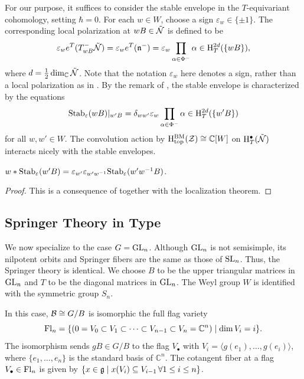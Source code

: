 For our purpose, it suffices to consider the stable envelope in the $T$-equivariant cohomology, setting $\hbar = 0$. For each $w \in W$, choose a sign $\varepsilon_w \in \{\pm 1\}$. The corresponding local polarization at $wB \in \tilde{\mathcal{N}}$ is defined to be
\begin{equation*}
    \varepsilon_w e^T(T^-_{wB}\tilde{\mathcal{N}})
    =
    \varepsilon_w e^T(\mathfrak{n}^-)
    =
    \varepsilon_w \prod_{\alpha \in \Phi^-}\alpha
    \in
    \mathrm{H}_T^{2d}(\{wB\}),
\end{equation*}
where $d = \frac{1}{2}\dim_\mathbb{C}\tilde{\mathcal{N}}$. Note that the notation $\varepsilon_w$ here denotes a sign, rather than a local polarization as in . By the remark of , the stable envelope is characterized by the equations
\begin{equation*}
    \mathrm{Stab}_\varepsilon(wB)|_{w'B}
    =
    \delta_{ww'}\varepsilon_w\prod_{\alpha\in\Phi^-}\alpha
    \in
    \mathrm{H}_T^{2d}(\{w'B\})
\end{equation*}
for all $w,w'\in W$. The convolution action by $\mathrm{H}^\mathrm{BM}_\mathrm{top}(\mathcal{Z})\cong\mathbb{C}[W]$ on $\mathrm{H}_T^\bullet(\tilde{\mathcal{N}})$ interacts nicely with the stable envelopes.

\begin{lemma}{}
    $w * \mathrm{Stab}_\varepsilon(w'B) = \varepsilon_{w'} \varepsilon_{w'w^{-1}} \mathrm{Stab}_\varepsilon(w'w^{-1}B)$.
    \begin{proof}
        This is a consequence of  together with the localization theorem.
    \end{proof}
\end{lemma}

\subsection{Springer Theory in Type }

We now specialize to the case $G = \mathrm{GL}_n$. Although $\mathrm{GL}_n$ is not semisimple, its nilpotent orbits and Springer fibers are the same as those of $\mathrm{SL}_n$. Thus, the Springer theory is identical. We choose $B$ to be the upper triangular matrices in $\mathrm{GL}_n$ and $T$ to be the diagonal matrices in $\mathrm{GL}_n$. The Weyl group $W$ is identified with the symmetric group $S_n$.

In this case, $\mathcal{B} \cong G/B$ is isomorphic the full flag variety
\begin{equation*}
    \mathrm{Fl}_n = \{ (0 = V_0 \subset V_1 \subset \dots \subset V_{n-1} \subset V_n = \mathbb{C}^n) \mid \dim V_i = i \}.
\end{equation*}
The isomorphism sends $gB \in G/B$ to the flag $V_\bullet$ with $V_i = \langle g(e_1), \dots, g(e_i) \rangle$, where $\{e_1, \dots, e_n\}$ is the standard basis of $\mathbb{C}^n$. The cotangent fiber at a flag $V_\bullet \in \mathrm{Fl}_n$ is given by $\{ x \in \mathfrak{g} \mid x(V_i) \subseteq V_{i-1} \,\forall 1 \leq i \leq n \}$.


